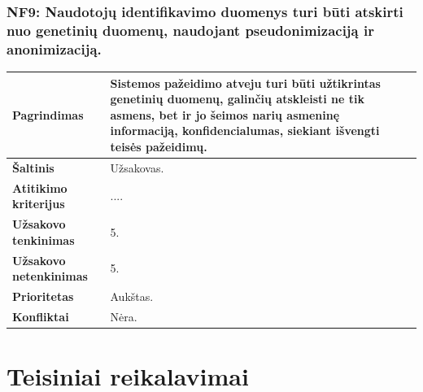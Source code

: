 \documentclass[12pt]{article}
\begin{document}
\subsubsection*{NF9: Naudotojų identifikavimo duomenys turi būti atskirti nuo
genetinių duomenų, naudojant pseudonimizaciją ir anonimizaciją.}
\label{sec:NF9}
\begin{table}[htb!]
    \captionsetup{justification=centering}
    \begin{tabular}{|m{4.9cm}|m{11cm}|}
        \hline
        \raggedleft \textbf{\cellcolor{deepchampagne}Pagrindimas} &
        Sistemos pažeidimo atveju turi būti užtikrintas genetinių duomenų,
        galinčių atskleisti ne tik asmens, bet ir jo šeimos narių asmeninę
        informaciją, konfidencialumas, siekiant išvengti teisės pažeidimų. \\
        \hline
        \raggedleft \textbf{\cellcolor{deepchampagne}Šaltinis} & Užsakovas. \\
        \hline
        \raggedleft \textbf{\cellcolor{deepchampagne}Atitikimo kriterijus} & 
        .... \\
        \hline
        \raggedleft \textbf{\cellcolor{deepchampagne}Užsakovo tenkinimas} & 5. \\
        \hline
        \raggedleft \textbf{\cellcolor{deepchampagne}Užsakovo netenkinimas} & 5. \\
        \hline
        \raggedleft \textbf{\cellcolor{deepchampagne}Prioritetas} & Aukštas. \\
        \hline
        \raggedleft \textbf{\cellcolor{deepchampagne}Konfliktai} & Nėra. \\
        \hline
    \end{tabular}
\end{table}


\section{Teisiniai reikalavimai}
\end{document}

